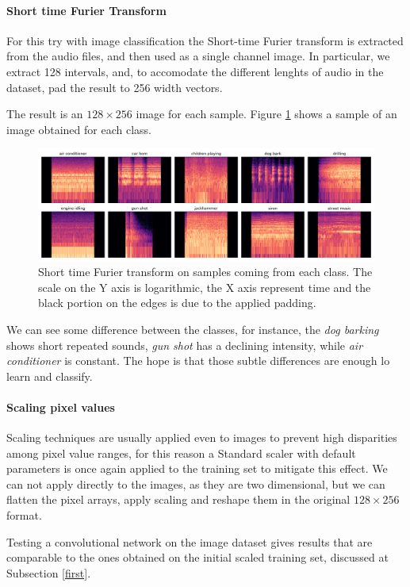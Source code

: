 \paragraph{Short time Furier Transform}
For this try with image classification the Short-time Furier transform 
is extracted from the audio files, and then used as a single channel image. 
In particular, we extract 128 intervals, and, to accomodate 
the different lenghts of audio in the dataset, pad the result to 256 width vectors.

The result is an $128 \times 256$ image for each sample. Figure \ref{img}
shows a sample of an image obtained for each class.

\begin{figure}
    \includegraphics[width=\textwidth]{images/class_images.png}  
    \caption{Short time Furier transform on samples coming from each class.
    The scale on the Y axis is logarithmic, the X axis represent time and 
    the black portion on the edges is due to the applied padding.}  
    \label{img}
\end{figure}

We can see some difference between the classes, for instance, the \emph{dog barking}
shows short repeated sounds, \emph{gun shot} has a declining intensity, while \emph{air conditioner}
is constant. The hope is that those subtle differences are enough lo learn and classify.

\paragraph{Scaling pixel values}
Scaling techniques  are usually applied even to images to prevent high disparities 
among pixel value ranges, for this reason a Standard scaler with default parameters is 
once again applied to the training set to mitigate this effect.
We can not apply directly to the images, as they are two dimensional, but we can 
flatten the pixel arrays, apply scaling and reshape them in the original $128 \times 256$ format.

Testing a convolutional network 
on the image dataset gives results that are comparable to the ones obtained on the initial scaled training 
set, discussed at Subsection \vref{first}.
\newpage
